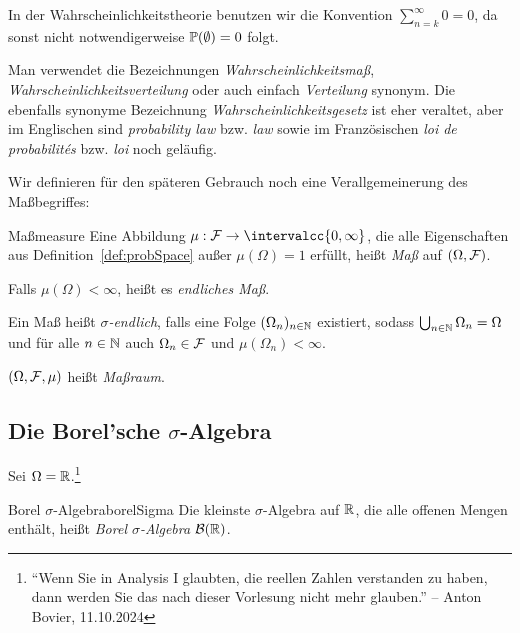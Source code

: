 \documentclass[language=ngerman]{../../Template/TemplateLecture}
\begin{document}
\begin{bemerkung}
    In der Wahrscheinlichkeitstheorie benutzen wir die Konvention $\sum_{n=k}^{\infty} 0 = 0$, da sonst nicht notwendigerweise $\mathbb{P}(\emptyset) = 0$ folgt.
\end{bemerkung}

\begin{bemerkung}
    Man verwendet die Bezeichnungen \emph{Wahrscheinlichkeitsmaß}, \emph{Wahrscheinlichkeitsverteilung} oder auch einfach \emph{Verteilung} synonym. Die ebenfalls synonyme Bezeichnung \emph{Wahrscheinlichkeitsgesetz} ist eher veraltet, aber im Englischen sind \emph{probability law} bzw. \emph{law} sowie im Französischen \emph{loi de probabilités} bzw. \emph{loi} noch geläufig.
\end{bemerkung}

Wir definieren für den späteren Gebrauch noch eine Verallgemeinerung des Maßbegriffes:
\begin{defi}{Maß}{measure}
    Eine Abbildung $\mu: \cF \to \intervalcc{0,\infty}$, die alle Eigenschaften aus Definition~\ref{def:probSpace} außer $\mu(\Omega) = 1$ erfüllt, heißt \emph{Maß} auf $(\Omega, \mathcal{F})$. 
    
    Falls $\mu(\Omega) < \infty$, heißt es \emph{endliches Maß}. 
    
    Ein Maß heißt \emph{$\sigma$-endlich}, falls eine Folge $(\Omega_n)_{n \in \mathbb{N}}$ existiert, sodass $\bigcup_{n \in \mathbb{N}} \Omega_n = \Omega$ und für alle $n \in \mathbb{N}$ auch $\Omega_n \in \mathcal{F}$ und $\mu(\Omega_n) < \infty$.

    $(\Omega, \mathcal{F}, \mu)$ heißt \emph{Maßraum}.
\end{defi}


\subsection{Die Borel'sche $\sigma$-Algebra}
Sei $\Omega = \mathbb{R}$.\footnote{\enquote{Wenn Sie in Analysis I glaubten, die reellen Zahlen verstanden zu haben, dann werden Sie das nach dieser Vorlesung nicht mehr glauben.} -- Anton Bovier, 11.10.2024}
\begin{defi}{Borel $\sigma$-Algebra}{borelSigma}
    Die kleinste $\sigma$-Algebra auf $\mathbb{R}$, die alle offenen Mengen enthält, heißt \emph{Borel $\sigma$-Algebra} $\mathcal{B}(\mathbb{R})$.
\end{defi}
\end{document}
